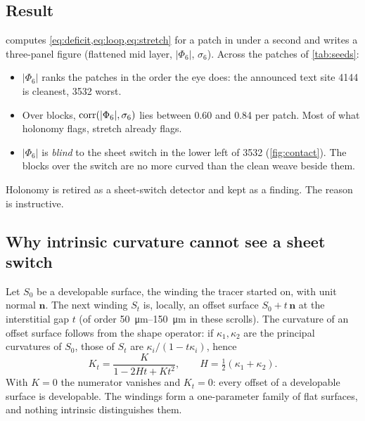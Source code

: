 \subsection{Result}
 computes \cref{eq:deficit,eq:loop,eq:stretch} for a patch in under a second and writes a three-panel figure (flattened mid layer, $|\Phi_6|$, $\sigma_6$). Across the patches of \cref{tab:seeds}:
\begin{itemize}
\item $|\Phi_6|$ ranks the patches in the order the eye does: the announced text site 4144 is cleanest, 3532 worst. 
\item Over blocks, $\operatorname{corr}(|\Phi_6|,\sigma_6)$ lies between 0.60 and 0.84 per patch. Most of what holonomy flags, stretch already flags.
\item $|\Phi_6|$ is \emph{blind} to the sheet switch in the lower left of 3532 (\cref{fig:contact}). The blocks over the switch are no more curved than the clean weave beside them.
\end{itemize}
Holonomy is retired as a sheet-switch detector and kept as a finding. The reason is instructive.

\subsection{Why intrinsic curvature cannot see a sheet switch}
\label{sec:holonomy-why}
Let $S_0$ be a developable surface, the winding the tracer started on, with unit normal $\mathbf{n}$. The next winding $S_t$ is, locally, an offset surface $S_0+t\,\mathbf{n}$ at the interstitial gap $t$ (of order \SIrange{50}{150}{\um} in these scrolls). The curvature of an offset surface follows from the shape operator: if $\kappa_1,\kappa_2$ are the principal curvatures of $S_0$, those of $S_t$ are $\kappa_i/(1-t\kappa_i)$, hence
\begin{equation}
K_t=\frac{K}{1-2Ht+Kt^{2}}, \qquad H=\tfrac12(\kappa_1+\kappa_2).
\label{eq:offset}
\end{equation}
With $K=0$ the numerator vanishes and $K_t=0$: every offset of a developable surface is developable. The windings form a one-parameter family of flat surfaces, and nothing intrinsic distinguishes them.

